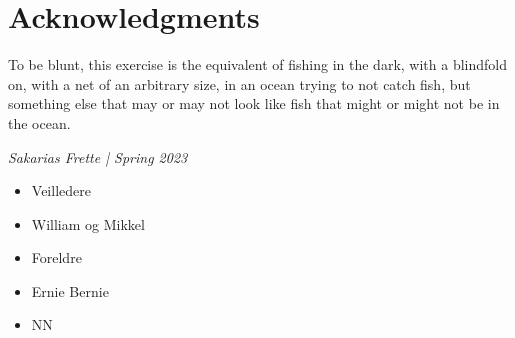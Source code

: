 \chapter*{Acknowledgments}



\epigraph{
    To be blunt, this exercise is the equivalent of fishing in the dark, 
    with a blindfold on, with a net of an arbitrary size, 
in an ocean trying to not catch fish, but something else 
that may or may not look like fish that might or might not be in the ocean.}{\textit{Sakarias Frette | Spring 2023}}

\begin{itemize}
\item Veilledere
\item William og Mikkel
\item Foreldre
\item Ernie Bernie  
\item NN

\end{itemize}